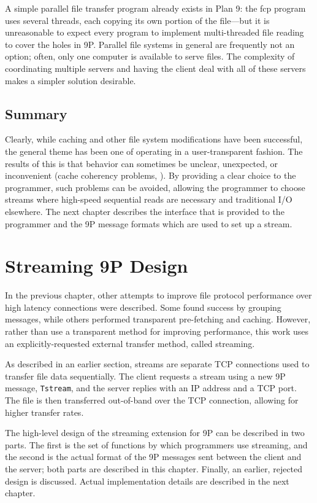 \documentclass[11pt,american]{report}
\begin{document}
A simple parallel file transfer program already exists in Plan 9: the fcp program uses several threads, each copying its own portion of the file---but it is unreasonable to expect every program to implement multi-threaded file reading to cover the holes in 9P. Parallel file systems in general are frequently not an option; often, only one computer is available to serve files. The complexity of coordinating multiple servers and having the client deal with all of these servers makes a simpler solution desirable.

\section{Summary}
Clearly, while caching and other file system modifications have been successful, the general theme has been one of operating in a user-transparent fashion. The results of this is that behavior can sometimes be unclear, unexpected, or inconvenient (cache coherency problems, \etc). By providing a clear choice to the programmer, such problems can be avoided, allowing the programmer to choose streams where high-speed sequential reads are necessary and traditional I/O elsewhere. The next chapter describes the interface that is provided to the programmer and the 9P message formats which are used to set up a stream.

\chapter{Streaming 9P Design}

In the previous chapter, other attempts to improve file protocol performance over high latency connections were described. Some found success by grouping messages, while others performed transparent pre-fetching and caching. However, rather than use a transparent method for improving performance, this work uses an explicitly-requested external transfer method, called streaming.

As described in an earlier section, streams are separate TCP connections used to transfer file data sequentially. The client requests a stream using a new 9P message, {\tt Tstream}, and the server replies with an IP address and a TCP port. The file is then transferred out-of-band over the TCP connection, allowing for higher transfer rates.

The high-level design of the streaming extension for 9P can be described in two parts. The first is the set of functions by which programmers use streaming, and the second is the actual format of the 9P messages sent between the client and the server; both parts are described in this chapter. Finally, an earlier, rejected design is discussed. Actual implementation details are described in the next chapter.
\end{document}
